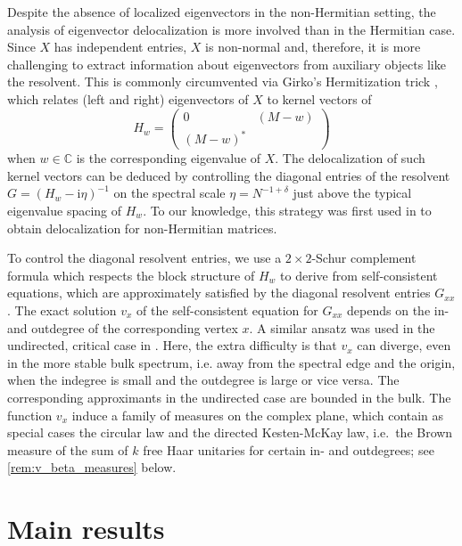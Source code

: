 \documentclass[11pt]{article}
\newcommand{\ii}{\mathrm{i}}
\newcommand{\C}{\mathbb{C}}
\theoremstyle{plain}
\theoremstyle{remark}
\numberwithin{equation}{section}
\begin{document}
	
	Despite the absence of localized eigenvectors in the non-Hermitian setting, the analysis of eigenvector delocalization is more involved than in the Hermitian case. 
	Since $X$ has independent entries, $X$ is non-normal and, therefore, it is more challenging to extract information about eigenvectors from auxiliary objects like the resolvent. 
	This is commonly circumvented via Girko's Hermitization trick \cite{girko1985circular}, which relates (left and right) eigenvectors of $X$ to kernel vectors of 
	\[ H_w = \begin{pmatrix} 0 & (M-w) \\ (M-w)^* \end{pmatrix} \]
	when $w \in \C$ is the corresponding eigenvalue of $X$. 
	The delocalization of such kernel vectors can be deduced by controlling the diagonal entries of the resolvent $G=(H_w - \ii \eta)^{-1}$ 
on the spectral scale $\eta = N^{-1 + \delta}$ just above the typical eigenvalue spacing of $H_w$. 
To our knowledge, this strategy was first used in \cite{AEKinhomogeneous} to obtain delocalization for non-Hermitian matrices.
	
	
	To control the diagonal resolvent entries, we use a $2\times 2$-Schur complement formula which 
	respects the block structure of $H_w$ to derive from self-consistent equations, which are approximately satisfied by the diagonal resolvent entries $G_{xx}$.  
	The exact solution $v_x$ of the self-consistent equation for $G_{xx}$ depends on the in- and outdegree of the corresponding vertex $x$. A similar ansatz was used in the undirected, critical case in  \cite{alt2021delocalization}. 
	Here, the extra difficulty is that $v_x$ can diverge, even in the more stable 
bulk spectrum, i.e. away from the spectral edge and the origin, when the indegree is small 
and the outdegree is large or vice versa. The corresponding approximants in the undirected case are bounded in the bulk. 
The function $v_x$ induce a family of measures on the complex plane, which contain as special cases the 
 circular law and the directed Kesten-McKay law, i.e.\ the Brown measure of the sum of $k$ free Haar unitaries for certain in- and outdegrees; see \cref{rem:v_beta_measures} below. 
	
	

	
	\section{Main results} \label{sec:main_results}
	
\end{document}
